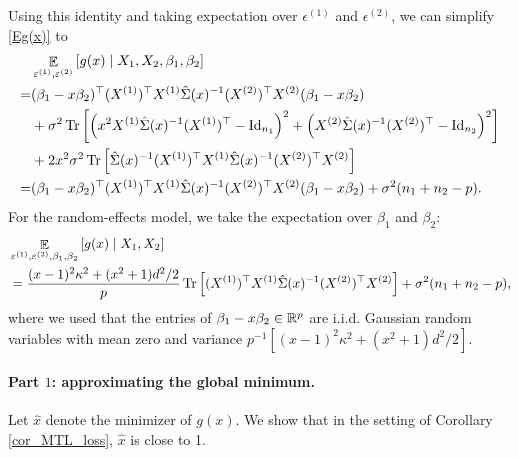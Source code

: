 Using this identity and taking expectation over $\epsilon^{(1)}$ and $\epsilon^{(2)}$, we can simplify \eqref{Eg(x)}  to
\begin{align*}
		&\mathop{\mathbb{E}}_{\varepsilon^{(1)}, \varepsilon^{(2)}}\left[ g(x) \mid X_1, X_2 ,\beta_1,\beta_2 \right] \\
		=& (\beta_1-x\beta_2)^\top(X^{(1)} )^\top X^{(1)}  \hat\Sigma(x)^{-1} (X^{(2)})^\top X^{(2)} (\beta_1-x\beta_2)  \\
		&+ \sigma^2\operatorname{Tr}\left[ \left(x^2 X^{(1)}\hat\Sigma(x)^{-1} (X^{(1)})^\top-\operatorname{Id}_{n_1}\right)^2+ \left(X^{(2)}\hat\Sigma(x)^{-1} (X^{(2)})^\top-\operatorname{Id}_{n_2}\right)^2 \right]\\
&+ 2 x^2 \sigma^2 \operatorname{Tr}\left[ \hat\Sigma(x)^{-1}  (X^{(1)})^\top X^{(1)}\hat\Sigma(x)^{-1} (X^{(2)})^\top X^{(2)} \right]  \nonumber\\
		=& (\beta_1-x\beta_2)^\top(X^{(1)} )^\top X^{(1)}  \hat\Sigma(x)^{-1} (X^{(2)})^\top X^{(2)} (\beta_1-x\beta_2) +\sigma^2(n_1+n_2-p).
\end{align*}
For the random-effects model, we take the expectation over $\beta_1$ and $\beta_2$:
\begin{align}
&\mathop{\mathbb{E}}_{\varepsilon^{(1)}, \varepsilon^{(2)} ,\beta_1,\beta_2}\left[ g(x) \mid X_1, X_2 \right] \nonumber\\
&=\frac{(x-1)^2\kappa^2 + (x^2+1)d^2/2}{p} \operatorname{Tr}\left[ (X^{(1)})^\top X^{(1)} \hat \Sigma(x)^{-1}(X^{(2)})^\top X^{(2)}\right]+\sigma^2(n_1+n_2-p), \label{EgA}
\end{align}
where we used that the entries of $\beta_1-x\beta_2\in \mathbb{R}^p$ are i.i.d. Gaussian random variables with mean zero and variance $p^{-1}[(x-1)^2\kappa^2 + (x^2+1)d^2/2]$.

\paragraph{Part $1$: approximating the global minimum.}
Let $\hat{x}$ denote the minimizer of $g(x)$.
We show that in the setting of Corollary \ref{cor_MTL_loss}, $\hat x$ is close to 1. 

